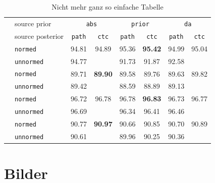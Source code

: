 \documentclass[12pt,DIV=15,BCOR=15mm,twoside,headsepline,abstract=true,listof=totoc,bibliography=totoc]{scrreprt}
\theoremstyle{remark}    %
\begin{document}
    \begin{table}[ht]
        \caption{Nicht mehr ganz so einfache Tabelle}\label{tab:dlv_restr_all}
        \centering
        \begin{tabular}{llcccccc}
            \hline\noalign{\smallskip}
            & source prior & \multicolumn{2}{c}{\texttt{abs}} & \multicolumn{2}{c}{\texttt{prior}} & \multicolumn{2}{c}{\texttt{da}}\\
            & source posterior & \texttt{path} & \texttt{ctc}   & \texttt{path} & \texttt{ctc}   & \texttt{path}& \texttt{ctc}\\
            \noalign{\smallskip}
            \hline
            \noalign{\smallskip}
            \multirow{ 2}{*}{gAP}   & \texttt{normed}     & 94.81         & 94.89          & 95.36        & \textbf{95.42} & 94.99& 95.04\\
            & \texttt{unnormed}   & 94.77         &               & 91.73        & 91.87          & 92.58        &            \\%
            \noalign{\smallskip}
            \multirow{ 2}{*}{mAP}   & \texttt{normed}     & 89.71         & \textbf{89.90} & 89.58        & 89.76           & 89.63& 89.82    \\
            & \texttt{unnormed}   & 89.42         &               & 88.59        & 88.89          & 89.13        &            \\
            \noalign{\smallskip}
            \multirow{ 2}{*}{gNDCG} & \texttt{normed}     & 96.72         & 96.78          & 96.78        & \textbf{96.83} & 96.73& 96.77    \\
            & \texttt{unnormed}   & 96.69         &               & 96.34        & 96.41          & 96.46       &              \\
            \noalign{\smallskip}
            \multirow{ 2}{*}{mNDCG} & \texttt{normed}     & 90.77         & \textbf{90.97} & 90.66        & 90.85           & 90.70& 90.89 \\
            & \texttt{unnormed}   & 90.61         &               & 89.96        & 90.25          & 90.36        &              \\
            \hline
        \end{tabular}
    \end{table}


    \section{Bilder}
\end{document}
